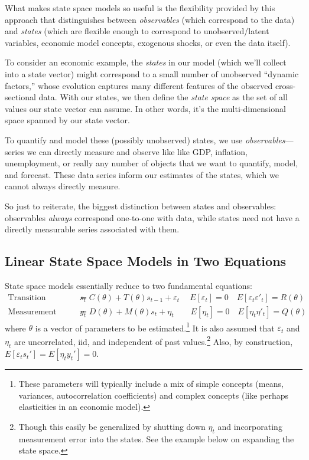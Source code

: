 \documentclass[a4paper,12pt]{article}
\begin{document}
What makes state space models so useful is the flexibility provided by
this approach that distinguishes between \emph{observables} (which
correspond to the data) and \emph{states} (which are flexible enough to
correspond to unobserved/latent variables, economic model concepts,
exogenous shocks, or even the data itself). 

To consider an economic example, the \emph{states} in our model (which
we'll collect into a state vector) might correspond to a small number of
unobserved ``dynamic factors,'' whose evolution captures many different
features of the observed cross-sectional data.  With our states, we then
define the \emph{state space} as the set of all values our state vector
can assume. In other words, it's the multi-dimensional space spanned by
our state vector. 

To quantify and model these (possibly unobserved) states, we use
\emph{observables}---series we can directly measure and observe like
like GDP, inflation, unemployment, or really any number of objects that
we want to quantify, model, and forecast. These data series inform our
estimates of the states, which we cannot always directly measure.  

So just to reiterate, the biggest distinction between states and
observables: observables \emph{always} correspond one-to-one with data,
while states need not have a directly measurable series associated with
them.

\subsection{Linear State Space Models in Two Equations}

State space models essentially reduce to two fundamental equations:
\begin{align}
  \text{Transition Equation:} \quad
    s_{t} &= C(\theta) + T(\theta) s_{t-1} + \varepsilon_{t} \label{ste}\
    \quad E[\varepsilon_t] = 0
    \quad E[\varepsilon_t \varepsilon'_t] =  R(\theta) \\
  \text{Measurement Equation:} \quad
    y_{t} &= D(\theta) + M(\theta) s_{t} + \eta_{t} \label{moe}
    \qquad E[\eta_t] =  0 
    \quad E[\eta_t \eta'_t] =  Q(\theta) 
\end{align}
where $\theta$ is a vector of parameters to be estimated.\footnote{These
parameters will typically include a mix of simple concepts (means,
variances, autocorrelation coefficients) and complex concepts (like
perhaps elasticities in an economic model).} It is also assumed that
$\varepsilon_t$ and $\eta_t$ are uncorrelated, iid, and independent of
past values.\footnote{Though this easily be generalized by shutting down
$\eta_t$ and incorporating measurement error into the states. See the
example below on expanding the state space.} Also, by construction, $E[\varepsilon_t s_t']=E[\eta_t
y_t']=0$.
\end{document}
